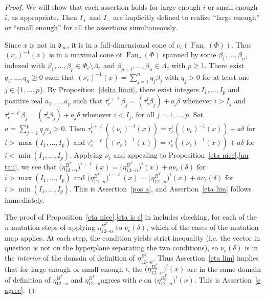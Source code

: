 \documentclass{amsart}
\theoremstyle{definition}
\theoremstyle{remark}
\numberwithin{equation}{section}
\newcommand{\set}[1]{{\lbrace #1 \rbrace}}
\newcommand{\0}{{\mathbf{0}}}
\newcommand{\Fan}{\operatorname{Fan}}
\renewcommand{\d}{{\mathfrak d}}
\newcommand{\RSChar}{\Phi}
\newcommand{\RS}{\RSChar}
\newcommand{\AP}[1]{\RS_{#1}}
\newcommand{\APTChar}{\Lambda}
\newcommand{\APT}[1]{\APTChar_{#1}}
\begin{document}
\begin{proof}
We will show that each assertion holds for large enough $i$ or small enough~$i$, as appropriate.
Then $I_+$ and $I_-$ are implicitly defined to realize ``large enough'' or ``small enough'' for all the assertions simultaneously.

Since $x$ is not in $\d_\infty$, it is in a full-dimensional cone of $\nu_c(\Fan_c(\RS))$.
Thus $(\nu_c)^{-1}(x)$ is in a maximal cone of $\Fan_c(\RS)$ spanned by some $\beta_1,\ldots,\beta_n$, indexed with $\beta_1,\ldots,\beta_p\in\AP{c}\setminus\APT{c}$ and $\beta_{p+1},\ldots,\beta_n\in\APT{c}$ with $p\ge1$.
There exist $q_1,\ldots,q_n\ge0$ such that $(\nu_c)^{-1}(x)=\sum_{j=1}^nq_j\beta_j$ with $q_j>0$ for at least one $j\in\set{1,\ldots,p}$.
By Proposition~\ref{delta limit}, there exist integers $I_1,\ldots,I_p$ and positive real $a_1,\ldots,a_p$ such that $\tau_c^{i+\ell}\beta_j=(\tau_c^i\beta_j)+a_j\delta$ whenever $i>I_j$ and $\tau_c^{i-\ell}\beta_j=(\tau_c^i\beta_j)+a_j\delta$ whenever $i<I_j$, for all $j=1,\ldots,p$.
Set $a=\sum_{j=1}^p q_ja_j>0$.
Then $\tau_c^{i+\ell}((\nu_c)^{-1}(x))=\tau_c^i((\nu_c)^{-1}(x))+a\delta$ for $i>\max(I_1,\ldots,I_p)$ and $\tau_c^{i-\ell}((\nu_c)^{-1}(x))=\tau_c^i((\nu_c)^{-1}(x))+a\delta$ for $i<\min(I_1,\ldots,I_p)$.
Applying $\nu_c$ and appealing to Proposition~\ref{eta nice}.\ref{nu tau}, we see that $\bigl(\eta_{12\cdots n}^{B^T}\bigr)^{i+\ell}(x)=\bigl(\eta_{12\cdots n}^{B^T}\bigr)^i(x)+a\nu_c(\delta)$ for $i>\max(I_1,\ldots,I_p)$ and $\bigl(\eta_{12\cdots n}^{B^T}\bigr)^{i-\ell}(x)=\bigl(\eta_{12\cdots n}^{B^T}\bigr)^i(x)+a\nu_c(\delta)$ for $i>\min(I_1,\ldots,I_p)$.
This is Assertion~\ref{pos a}, and Assertion~\ref{eta lim} follows immediately.

The proof of Proposition~\ref{eta nice}.\ref{eta is c} in \cite[Proposition~7.31]{affscat} includes checking, for each of the $n$ mutation steps of applying $\eta^{B^T}_{12\cdots n}$ to $\nu_c(\delta)$, which of the cases of the mutation map applies.
At each step, the condition yields strict inequality (i.e. the vector in question is not on the hyperplane separating the two conditions), so $\nu_c(\delta)$ is in the \emph{interior} of the domain of definition of $\eta^{B^T}_{12\cdots n}$.
Thus Assertion~\ref{eta lim} implies that for large enough or small enough $i$, the $\bigl(\eta_{12\cdots n}^{B_0^T}\bigr)^i(x)$ are in the same domain of definition of $\eta^{B^T}_{12\cdots n}$ and $\eta^{B^T}_{12\cdots n}$agrees with $c$ on $\bigl(\eta_{12\cdots n}^{B_0^T}\bigr)^i(x)$.
This is Assertion~\ref{c agree}.


\end{proof}
\end{document}
